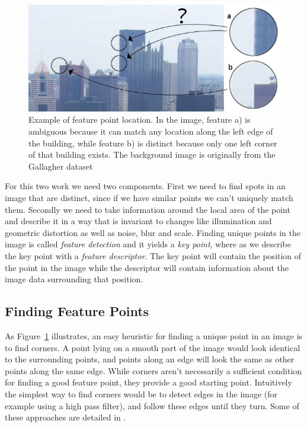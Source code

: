 \begin{figure}[t]
	\centering
	\includegraphics[width=1\columnwidth]{images/feature_point}
	\caption{Example of feature point location. In the image, feature a) 
is ambiguous because it can match any location along the left edge of 
the building, while feature b) is distinct because only one left corner 
of that building exists. The background image is originally from the 
Gallagher dataset \cite{gallagher2008}}
	\label{fig:feature_point}
\end{figure}

For this two work we need two components. First we need to find spots in 
an image that are distinct, since if we have similar points we can't 
uniquely match them. Secondly we need to take information around the 
local area of the point and describe it in a way that is invariant to 
changes like illumination and geometric distortion as well as noise, 
blur and scale. Finding unique points in the image is called 
\emph{feature detection} and it yields a \emph{key point}, where as we 
describe the key point with a \emph{feature descriptor}. The key point 
will contain the position of the point in the image while the descriptor 
will contain information about the image data surrounding that position.

\subsection{Finding Feature Points}

As Figure~\ref{fig:feature_point} illustrates, an easy heuristic for 
finding a unique point in an image is to find corners. A point lying on 
a smooth part of the image would look identical to the surrounding 
points, and points along an edge will look the same as other points 
along the same edge. While corners aren't necessarily a sufficient 
condition for finding a good feature point, they provide a good starting 
point. Intuitively the simplest way to find corners would be to detect 
edges in the image (for example using a high pass filter), and follow 
these edges until they turn. Some of these approaches are detailed in 
\cite{university1978comparison}. 

